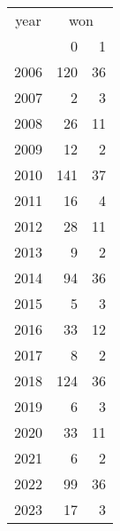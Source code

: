 \footnotesize\begin{tabular}[t]{lrr}
\toprule
\multicolumn{1}{c}{year} & \multicolumn{2}{c}{won} \\
\cmidrule(l{3pt}r{3pt}){1-1} \cmidrule(l{3pt}r{3pt}){2-3}
  & 0 & 1\\
\midrule
2006 & 120 & 36\\
2007 & 2 & 3\\
2008 & 26 & 11\\
2009 & 12 & 2\\
2010 & 141 & 37\\
2011 & 16 & 4\\
2012 & 28 & 11\\
2013 & 9 & 2\\
2014 & 94 & 36\\
2015 & 5 & 3\\
2016 & 33 & 12\\
2017 & 8 & 2\\
2018 & 124 & 36\\
2019 & 6 & 3\\
2020 & 33 & 11\\
2021 & 6 & 2\\
2022 & 99 & 36\\
2023 & 17 & 3\\
\bottomrule
\end{tabular}
